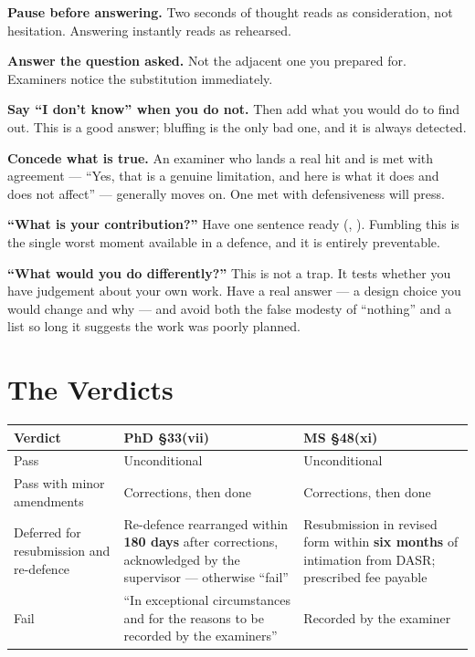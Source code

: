 \begin{conceptbox}
\begin{tightnum}
  \item \textbf{Pause before answering.} Two seconds of thought reads as
    consideration, not hesitation. Answering instantly reads as rehearsed.
  \item \textbf{Answer the question asked.} Not the adjacent one you prepared
    for. Examiners notice the substitution immediately.
  \item \textbf{Say ``I don't know'' when you do not.} Then add what you would
    do to find out. This is a good answer; bluffing is the only bad one, and
    it is always detected.
  \item \textbf{Concede what is true.} An examiner who lands a real hit and is
    met with agreement --- ``Yes, that is a genuine limitation, and here is
    what it does and does not affect'' --- generally moves on. One met with
    defensiveness will press.
\end{tightnum}
\end{conceptbox}

\begin{alertbox}
\textbf{``What is your contribution?''} Have one sentence ready
(, ). Fumbling this is the single worst
moment available in a defence, and it is entirely preventable.

\medskip
\textbf{``What would you do differently?''} This is not a trap. It tests
whether you have judgement about your own work. Have a real answer --- a design
choice you would change and why --- and avoid both the false modesty of
``nothing'' and a list so long it suggests the work was poorly planned.
\end{alertbox}

\section{The Verdicts}

\begin{center}
\small
\begin{tabular}{@{}L{4.0cm}L{5.0cm}L{5.3cm}@{}}
\toprule
\textbf{Verdict} & \textbf{PhD \S33(vii)} & \textbf{MS \S48(xi)} \\
\midrule
Pass
  & Unconditional
  & Unconditional \\
Pass with minor amendments
  & Corrections, then done
  & Corrections, then done \\
Deferred for resubmission and re-defence
  & Re-defence rearranged within \textbf{180 days} after corrections,
    acknowledged by the supervisor --- otherwise ``fail''
  & Resubmission in revised form within \textbf{six months} of intimation from
    DASR; prescribed fee payable \\
Fail
  & ``In exceptional circumstances and for the reasons to be recorded by the
    examiners''
  & Recorded by the examiner \\
\bottomrule
\end{tabular}
\end{center}

